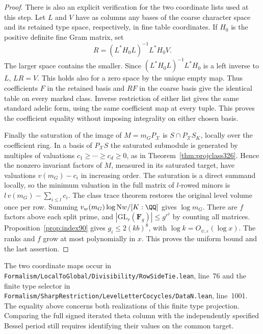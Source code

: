 \documentclass[a4paper,11pt]{article}
\theoremstyle{definition}
\theoremstyle{remark}
\newcommand{\srcloc}[2]{{\small\nolinkurl{#1.lean}}, line~#2}
\numberwithin{equation}{section}
\begin{document}
\begin{proof}
There is also an explicit verification for the two coordinate
lists used at this step. Let \(L\) and \(V\) have as columns
any bases of the coarse character space and its retained type
space, respectively, in fine table coordinates. If \(H_0\)
is the positive definite fine Gram matrix, set
\[
 R=(L^*H_0L)^{-1}L^*H_0 V .
\]
The larger space contains the smaller. Since
\((L^*H_0L)^{-1}L^*H_0\) is a left inverse to \(L\),
\(LR=V\). This holds also for a zero space by the unique
empty map. Thus coefficients \(F\) in the retained basis
and \(RF\) in the coarse basis give the identical table on
every marked class. Inverse restriction of either list gives
the same standard adelic form, using the same coefficient
map at every tuple. This proves the coefficient equality
without imposing integrality on either chosen basis.

Finally the saturation of the image of \(M=m_GP_{\mathcal X}\)
is \(S\cap P_{\mathcal X}S_K\), locally over the coefficient
ring. In a basis of \(P_{\mathcal X}S\) the saturated
submodule is generated by multiples of valuations
\(c_1\ge\cdots\ge c_d\ge0\), as in
Theorem~\ref{thm:projclass326}. Hence the nonzero invariant
factors of \(M\), measured in its saturated target, have
valuations \(v(m_G)-c_i\) in increasing order.
The saturation is a direct summand locally, so the minimum
valuation in the full matrix of \(l\)-rowed minors is
\(l\,v(m_G)-\sum_{i\le l}c_i\). The class trace theorem
restores the original level volume once per row.
Summing \(v_w(m_G)\log\mathrm Nw/[K:\QQ]\) gives \(\log m_G\).
There are \(f\) factors above each split prime, and
\(|\mathrm{GL}_r(\mathbf F_g)|\le g^{r^2}\) by counting all
matrices. Proposition~\ref{prop:index90} gives
\(g_i\le2(kb)^8\), with \(\log k=O_{\psi,\varepsilon}(\log x)\).
The ranks and \(f\) grow at most polynomially in \(x\).
This proves the uniform bound and the last assertion.
\end{proof}

The two coordinate maps occur in
\srcloc{Formalism/LocalToGlobal/Divisibility/RowSideTie}{76}
and the finite type selector in
\srcloc{Formalism/SharpRestriction/LevelLetterCocycles/DataN}{1001}.
The equality above concerns both realizations of this finite
type projection. Comparing the full signed iterated theta
column with the independently specified Bessel period still
requires identifying their values on the common target.
\end{document}
